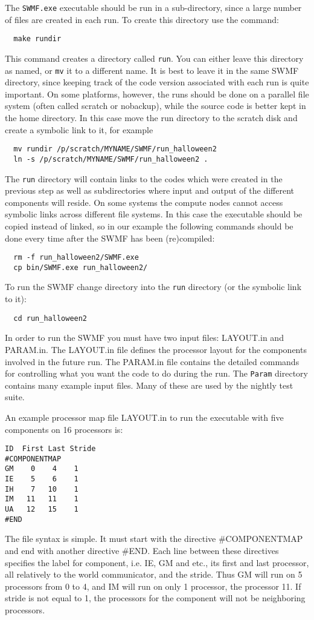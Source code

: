 The {\tt SWMF.exe} executable should be run in a sub-directory, 
since a large number of files are created in each run.  
To create this directory use the command:
\begin{verbatim}
  make rundir
\end{verbatim} 
This command creates a directory called {\tt run}.  You can either
leave this directory as named, or {\tt mv} it to a different name.  It
is best to leave it in the same SWMF directory, since
keeping track of the code version associated with each run is quite
important. On some platforms, however, the runs should be done on a
parallel file system (often called scratch or nobackup), while the
source code is better kept in the home directory. In this case move
the run directory to the scratch disk and create a symbolic link to it, 
for example
\begin{verbatim}
  mv rundir /p/scratch/MYNAME/SWMF/run_halloween2
  ln -s /p/scratch/MYNAME/SWMF/run_halloween2 .
\end{verbatim}
The {\tt run} directory will contain links to the codes
which were created in the previous step as well as subdirectories
where input and output of the different components will reside.
On some systems the compute nodes cannot access symbolic links
across different file systems. In this case the executable should be 
copied instead of linked, so in our example the following commands
should be done every time after the SWMF has been (re)compiled:
\begin{verbatim}
  rm -f run_halloween2/SWMF.exe
  cp bin/SWMF.exe run_halloween2/
\end{verbatim}
To run the SWMF change directory into the {\tt run} directory 
(or the symbolic link to it):
\begin{verbatim}
  cd run_halloween2
\end{verbatim}
In order to run the SWMF you must have two input files:  LAYOUT.in and
PARAM.in.  The LAYOUT.in file defines the processor
layout for the components involved in the future run.  The PARAM.in
file contains the detailed commands for controlling what you want the
code to do during the run.  The {\tt Param} directory contains many
example input files. Many of these are used by the nightly test suite.

An example processor map file LAYOUT.in to run the executable with
five components on 16 processors is:
\begin{verbatim}
ID  First Last Stride
#COMPONENTMAP
GM    0    4    1
IE    5    6    1
IH    7   10    1
IM   11   11    1
UA   12   15    1
#END
\end{verbatim}
The file syntax is simple. It must start with the directive
\#COMPONENTMAP and end with another directive \#END. Each line between
these directives specifies the label for component, i.e. IE, GM and
etc., its first and last processor, all relatively to the world
communicator, and the stride. Thus GM will run on 5 processors from 0
to 4, and IM will run on only 1 processor, the processor 11.  If
stride is not equal to 1, the processors for the component will not be
neighboring processors.

